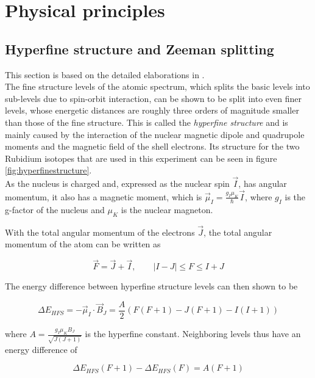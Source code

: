 \section{Physical principles}
\subsection{Hyperfine structure and Zeeman splitting}
This section is based on the detailed elaborations in \cite{staatsex}.\\
The fine structure levels of the atomic spectrum, which splits the basic levels into sub-levels due to spin-orbit interaction, can be shown to be split into even finer levels, whose energetic distances are roughly three orders of magnitude smaller than those of the fine structure. This is called the \emph{hyperfine structure} and is mainly caused by the interaction of the nuclear magnetic dipole and quadrupole moments and the magnetic field of the shell electrons. Its structure for the two Rubidium isotopes that are used in this experiment can be seen in figure \ref{fig:hyperfinestructure}.\\

As the nucleus is charged and, expressed as the nuclear spin $\vec{I}$, has angular momentum, it also has a magnetic moment, which is $\vec{\mu}_I=\frac{g_I\mu_K}{\hbar}\vec{I}$, where $g_I$ is the g-factor of the nucleus and $\mu_K$ is the nuclear magneton. 

With the total angular momentum of the electrons $\vec{J}$, the total angular momentum of the atom can be written as

\begin{equation}
\vec{F}=\vec{J}+\vec{I},\qquad \lvert I-J\rvert\le F \le I+J
\end{equation}

The energy difference between hyperfine structure levels can then shown to be

\begin{equation}
\Delta E_{HFS}=-\vec{\mu}_I\cdot\vec{B}_J=\frac{A}{2}(F(F+1)-J(F+1)-I(I+1))
\end{equation}

where $A=\frac{g_I\mu_KB_J}{\sqrt{J(J+1)}}$ is the hyperfine constant. Neighboring levels thus have an energy difference of

\begin{equation}
\Delta E_{HFS}(F+1)-\Delta E_{HFS}(F)=A(F+1)
\label{eq:hfslevels}
\end{equation}

